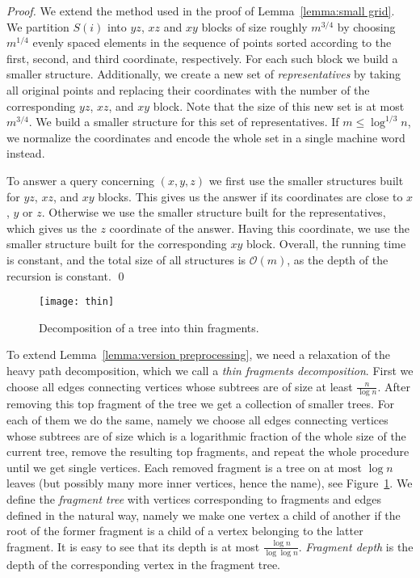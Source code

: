 \documentclass[runningheads]{llncs}
\begin{document}
\begin{proof}
We extend the method used in the proof of Lemma~\ref{lemma:small grid}. We partition $S(i)$ into $yz$, $xz$ and $xy$ blocks of size roughly $m^{3/4}$ by choosing $m^{1/4}$ evenly spaced elements in the sequence of points sorted according to the first, second, and third coordinate, respectively. For each such block we build a smaller structure. Additionally, we create a new set of {\it representatives} by taking all original points and replacing their coordinates with the number of the corresponding $yz$, $xz$, and $xy$ block. Note that the size of this new set is at most $m^{3/4}$. We build a smaller structure for this set of representatives. If $m\leq\log^{1/3}n$, we normalize the coordinates and encode the whole set in a single machine word instead.

To answer a query concerning $(x,y,z)$ we first use the smaller structures built for $yz$, $xz$, and $xy$ blocks. This gives us the answer if its coordinates are close to $x$, $y$ or $z$. Otherwise we use the smaller structure built for the representatives, which gives us the $z$ coordinate of the answer. Having this coordinate, we use the smaller structure built for the corresponding $xy$ block. Overall, the running time is constant, and the total size of all structures is $\mathcal{O}(m)$, as the depth of the recursion is constant.
\qed
\end{proof}

\begin{figure}
\centering
\texttt{[image: thin]}
\caption{Decomposition of a tree into thin fragments.}
\label{figure:thin fragments}
\end{figure}

To extend Lemma~\ref{lemma:version preprocessing}, we need a relaxation of the heavy path decomposition, which we call a {\it thin fragments decomposition}.  First we choose all edges connecting vertices whose subtrees are of size at least $\frac{n}{\log n}$. After removing this top fragment
of the tree we get a collection of smaller trees. For each of them we do the same, namely we choose all edges connecting vertices whose subtrees are of size which is a logarithmic fraction of the whole size of the current tree, remove the resulting top fragments, and repeat the whole procedure until we get single vertices. Each removed fragment is a tree on at most $\log n$ leaves (but possibly many more inner vertices, hence the name), see Figure~\ref{figure:thin fragments}. We define the {\it fragment tree} with vertices corresponding to fragments and edges defined in the natural way, namely we make one vertex a child of another if the root of the former fragment is a child of a vertex belonging to the latter fragment. It is easy to see that its depth is at most $\frac{\log n}{\log\log n}$. {\it Fragment depth} is the depth of the corresponding vertex in the fragment tree.
\end{document}
